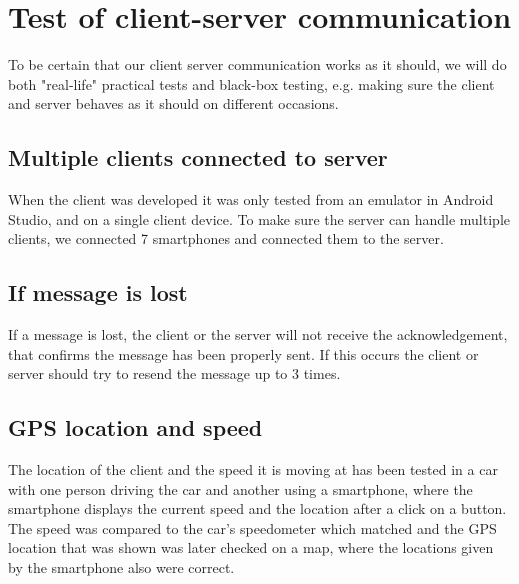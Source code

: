 \section{Test of client-server communication}
To be certain that our client server communication works as it should, we will do both "real-life" practical tests and black-box testing, e.g. making sure the client and server behaves as it should on different occasions.

\subsection{Multiple clients connected to server}
When the client was developed it was only tested from an emulator in Android Studio, and on a single client device. To make sure the server can handle multiple clients, we connected 7 smartphones and connected them to the server.

\subsection{If message is lost}
If a message is lost, the client or the server will not receive the acknowledgement, that confirms the message has been properly sent. If this occurs the client or server should try to resend the message up to 3 times.

\subsection{GPS location and speed}
The location of the client and the speed it is moving at has been tested in a car with one person driving the car and another using a smartphone, where the smartphone displays the current speed and the location after a click on a button. The speed was compared to the car's speedometer which matched and the GPS location that was shown was later checked on a map, where the locations given by the smartphone also were correct.